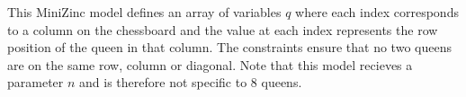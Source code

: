This MiniZinc model defines an array of variables $q$ where each index corresponds to a column on the chessboard and the value at each index represents the row position of the queen in that column. The constraints ensure that no two queens are on the same row, column or diagonal. Note that this model recieves a parameter $n$ and is therefore not specific to $8$ queens.

